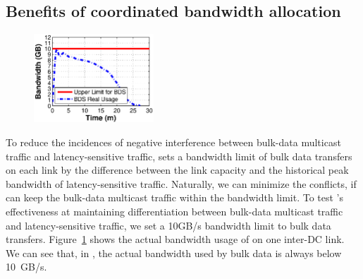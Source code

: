 \subsection{Benefits of coordinated bandwidth allocation}
\label{subsec:evaluation:separation}
\begin{figure}[t]
  \centering
  \includegraphics[width=45mm]{images/Quota_v2.eps}%
  \tightcaption{\color{red}{DELETE: The effectiveness of bandwidth separation.}}
  \label{fig:quota}
\vspace{-0.4cm}
\end{figure}

To reduce the incidences of negative interference between bulk-data
multicast traffic and latency-sensitive traffic, \company sets a
bandwidth limit of bulk data transfers on each link by the difference
between the link capacity and the historical peak bandwidth of
latency-sensitive traffic. Naturally, we can minimize the conflicts,
if \name can keep the bulk-data multicast traffic within the bandwidth
limit. To test \name's effectiveness at maintaining differentiation between
bulk-data multicast traffic and latency-sensitive traffic, we set a
10GB/s bandwidth limit to bulk data transfers.
Figure~\ref{fig:quota} shows the actual bandwidth usage of \name on
one inter-DC link. We can see that, in \name, the actual bandwidth used
by bulk data is always below 10~GB/s.


